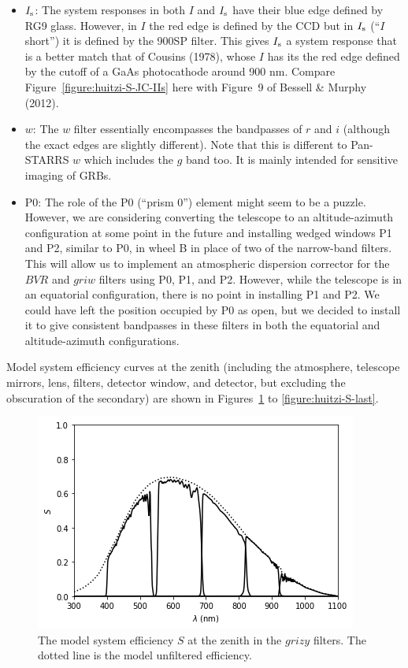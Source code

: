 \begin{itemize}
\item $\mbox{$I_\mathrm{s}$}$: The system responses in both $I$ and $\mbox{$I_\mathrm{s}$}$ have their blue edge defined by RG9 glass. However, in $I$ the red edge is defined by the CCD but in $\mbox{$I_\mathrm{s}$}$ (“$I$ short”) it is defined by the 900SP filter. This gives $\mbox{$I_\mathrm{s}$}$ a system response that is a better match that of Cousins (1978), whose $I$ has its the red edge defined by the cutoff of a GaAs photocathode around 900 nm. Compare Figure~\ref{figure:huitzi-S-JC-IIs} here with Figure~9 of Bessell \& Murphy (2012).

\item
$w$: The $w$ filter essentially encompasses the bandpasses of $r$ and $i$ (although the exact edges are slightly different). Note that this is different to Pan-STARRS $w$ which includes the $g$ band too. It is mainly intended for sensitive imaging of GRBs.

\item P0: The role of the P0 (“prism 0”) element might seem to be a puzzle. However, we are considering converting the telescope to an altitude-azimuth configuration at some point in the future and installing wedged windows P1 and P2, similar to P0, in wheel B in place of two of the narrow-band filters. This will allow us to implement an atmospheric dispersion corrector  for the $BVR$ and $griw$ filters using P0, P1, and P2. However, while the telescope is in an equatorial configuration, there is no point in installing P1 and P2. We could have left the position occupied by P0 as open, but we decided to install it to give consistent bandpasses in these filters in both the equatorial and altitude-azimuth configurations.

\end{itemize}

Model system efficiency curves at the zenith (including the atmosphere, telescope mirrors, lens, filters, detector window, and detector, but excluding the obscuration of the secondary) are shown in Figures~\ref{figure:huitzi-S-first} to \ref{figure:huitzi-S-last}.

\begin{figure}
\begin{center}
\includegraphics[width=0.7\linewidth]{figures/huitzi-S-grizy.png}
\medskip
\caption{The model system efficiency $S$ at the zenith in the $grizy$ filters. The dotted line is the model unfiltered efficiency.}
\label{figure:huitzi-S-first}
\end{center}
\end{figure}

